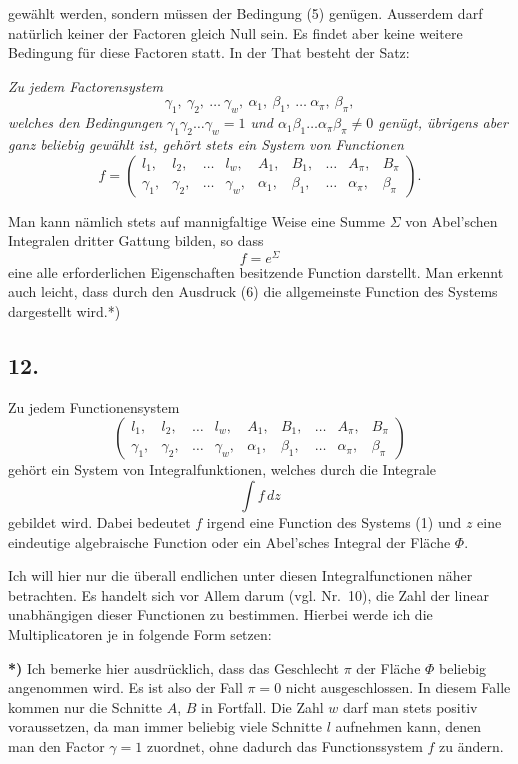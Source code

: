 \documentclass{article}
\begin{document}
gewählt werden, sondern müssen der Bedingung (5) genügen. Ausserdem darf natürlich keiner der Factoren gleich Null sein. Es findet aber keine weitere Bedingung für diese Factoren statt. In der That besteht der Satz:

\emph{Zu jedem Factorensystem}
\[
\gamma_1, \ \gamma_2, \ \dots \ \gamma_w, \ \alpha_1, \ \beta_1, \ \dots \ \alpha_\pi, \ \beta_\pi,
\]
\emph{welches den Bedingungen $\gamma_1 \gamma_2 \dots \gamma_w = 1$ und $\alpha_1 \beta_1 \dots \alpha_\pi \beta_\pi \neq 0$ genügt, übrigens aber ganz beliebig gewählt ist, gehört stets ein System von Functionen}
\[
f = \begin{pmatrix}
l_1, & l_2, & \dots & l_w, & A_1, & B_1, & \dots & A_\pi, & B_\pi \\
\gamma_1, & \gamma_2, & \dots & \gamma_w, & \alpha_1, & \beta_1, & \dots & \alpha_\pi, & \beta_\pi
\end{pmatrix}.
\]

Man kann nämlich stets auf mannigfaltige Weise eine Summe $\varSigma$ von Abel'schen Integralen dritter Gattung bilden, so dass
\[
f = e^{\varSigma} \tag{6}
\]
eine alle erforderlichen Eigenschaften besitzende Function darstellt. Man erkennt auch leicht, dass durch den Ausdruck (6) die allgemeinste Function des Systems dargestellt wird.*)

\subsection*{12.}

Zu jedem Functionensystem
\[
\begin{pmatrix}
l_1, & l_2, & \dots & l_w, & A_1, & B_1, & \dots & A_\pi, & B_\pi \\
\gamma_1, & \gamma_2, & \dots & \gamma_w, & \alpha_1, & \beta_1, & \dots & \alpha_\pi, & \beta_\pi
\end{pmatrix} \tag{1}
\]
gehört ein System von Integralfunktionen, welches durch die Integrale
\[
\int f\,dz
\]
gebildet wird. Dabei bedeutet $f$ irgend eine Function des Systems (1) und $z$ eine eindeutige algebraische Function oder ein Abel'sches Integral der Fläche $\Phi$.

Ich will hier nur die überall endlichen unter diesen Integralfunctionen näher betrachten. Es handelt sich vor Allem darum (vgl. Nr.~10), die Zahl der linear unabhängigen dieser Functionen zu bestimmen. Hierbei werde ich die Multiplicatoren je in folgende Form setzen:

\textbf{*)} Ich bemerke hier ausdrücklich, dass das Geschlecht $\pi$ der Fläche $\Phi$ beliebig angenommen wird. Es ist also der Fall $\pi = 0$ nicht ausgeschlossen. In diesem Falle kommen nur die Schnitte $A$, $B$ in Fortfall. Die Zahl $w$ darf man stets positiv voraussetzen, da man immer beliebig viele Schnitte $l$ aufnehmen kann, denen man den Factor $\gamma = 1$ zuordnet, ohne dadurch das Functionssystem $f$ zu ändern.
\end{document}
